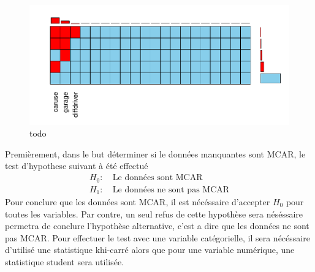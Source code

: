 \documentclass[
]{article}
\begin{document}
\begin{figure}

{\centering \includegraphics{01-01-Pretraitement_files/figure-latex/MissingPattern-1} 

}

\caption{\label{fig:missingPatern}todo}\label{fig:MissingPattern}
\end{figure}

Premièrement, dans le but déterminer si le données manquantes sont MCAR,
le test d'hypothese suivant à été effectué \begin{align*}
  H_0:&\: \text{Le données sont MCAR} \\
  H_1:&\: \text{Le données ne sont pas MCAR}
\end{align*} Pour conclure que les données sont MCAR, il est nécéssaire
d'accepter \(H_0\) pour toutes les variables. Par contre, un seul refus
de cette hypothèse sera néséssaire permetra de conclure l'hypothèse
alternative, c'est a dire que les données ne sont pas MCAR. Pour
effectuer le test avec une variable catégorielle, il sera nécéssaire
d'utilisé une statistique khi-carré alors que pour une variable
numérique, une statistique student sera utilisée.
\end{document}
